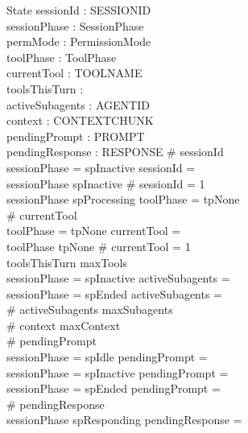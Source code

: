 \documentclass[a4paper,10pt,fleqn]{article}
\begin{document}
\begin{schema}{State}
  sessionId : \finset SESSIONID \\
  sessionPhase : SessionPhase \\
  permMode : PermissionMode \\
  toolPhase : ToolPhase \\
  currentTool : \finset TOOLNAME \\
  toolsThisTurn : \nat \\
  activeSubagents : \finset AGENTID \\
  context : \seq CONTEXTCHUNK \\
  pendingPrompt : \finset PROMPT \\
  pendingResponse : \finset RESPONSE
  \where
  \# sessionId  \\
  sessionPhase = spInactive \implies sessionId = \emptyset \\
  sessionPhase \neq spInactive \implies \# sessionId = 1 \\
  sessionPhase \neq spProcessing \implies toolPhase = tpNone \\
  \# currentTool  \\
  toolPhase = tpNone \implies currentTool = \emptyset \\
  toolPhase \neq tpNone \implies \# currentTool = 1 \\
  toolsThisTurn \leq maxTools \\
  sessionPhase = spInactive \implies activeSubagents = \emptyset \\
  sessionPhase = spEnded \implies activeSubagents = \emptyset \\
  \# activeSubagents \leq maxSubagents \\
  \# context \leq maxContext \\
  \# pendingPrompt  \\
  sessionPhase = spIdle \implies pendingPrompt = \emptyset \\
  sessionPhase = spInactive \implies pendingPrompt = \emptyset \\
  sessionPhase = spEnded \implies pendingPrompt = \emptyset \\
  \# pendingResponse  \\
  sessionPhase \neq spResponding \implies pendingResponse = \emptyset
\end{schema}
\end{document}
